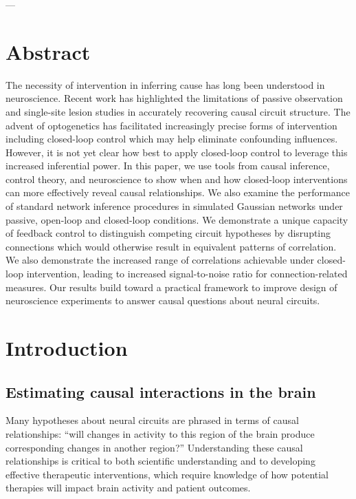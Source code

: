 \documentclass{article}
\begin{document}
---\hypertarget{abstract}{%
\section{Abstract}\label{abstract}}

The necessity of intervention in inferring cause has long been understood in neuroscience. Recent work has highlighted the limitations of passive observation and single-site lesion studies in accurately recovering causal circuit structure. The advent of optogenetics has facilitated increasingly precise forms of intervention including closed-loop control which may help eliminate confounding influences. However, it is not yet clear how best to apply closed-loop control to leverage this increased inferential power. In this paper, we use tools from causal inference, control theory, and neuroscience to show when and how closed-loop interventions can more effectively reveal causal relationships. We also examine the performance of standard network inference procedures in simulated Gaussian networks under passive, open-loop and closed-loop conditions. We demonstrate a unique capacity of feedback control to distinguish competing circuit hypotheses by disrupting connections which would otherwise result in equivalent patterns of correlation. We also demonstrate the increased range of correlations achievable under closed-loop intervention, leading to increased signal-to-noise ratio for connection-related measures. Our results build toward a practical framework to improve design of neuroscience experiments to answer causal questions about neural circuits.

\hypertarget{introduction}{%
\section{Introduction}\label{introduction}}

\hypertarget{estimating-causal-interactions-in-the-brain}{%
\subsection{Estimating causal interactions in the brain}\label{estimating-causal-interactions-in-the-brain}}

Many hypotheses about neural circuits are phrased in terms of causal relationships: ``will changes in activity to this region of the brain produce corresponding changes in another region?'' Understanding these causal relationships is critical to both scientific understanding and to developing effective therapeutic interventions, which require knowledge of how potential therapies will impact brain activity and patient outcomes.
\end{document}
